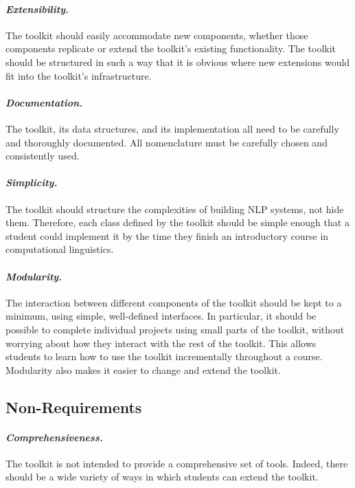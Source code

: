 \documentclass[11pt]{article}
\begin{document}
\paragraph{\textit{Extensibility.}} The toolkit should easily
accommodate new components, whether those components replicate or
extend the toolkit's existing functionality.  The toolkit should be
structured in such a way that it is obvious where new extensions would
fit into the toolkit's infrastructure.

\paragraph{\textit{Documentation.}} The toolkit, its data structures,
and its implementation all need to be carefully and thoroughly
documented.  All nomenclature must be carefully chosen and
consistently used.

\paragraph{\textit{Simplicity.}} The toolkit should structure the
complexities of building NLP systems, not hide them.  Therefore, each
class defined by the toolkit should be simple enough that a student
could implement it by the time they finish an introductory course in
computational linguistics.

\paragraph{\textit{Modularity.}} The interaction between different
components of the toolkit should be kept to a minimum, using simple,
well-defined interfaces.  In particular, it should be possible to
complete individual projects using small parts of the toolkit, without
worrying about how they interact with the rest of the toolkit.  This
allows students to learn how to use the toolkit incrementally
throughout a course.  Modularity also makes it easier to change and
extend the toolkit.

\subsection{Non-Requirements}

\paragraph{\textit{Comprehensiveness.}} The toolkit is not intended to
provide a comprehensive set of tools.  Indeed, there should be a wide
variety of ways in which students can extend the toolkit.
\end{document}
